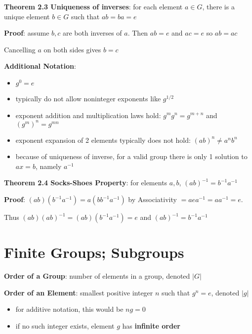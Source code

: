\documentclass{article}
\begin{document}
    \textbf{Theorem 2.3 Uniqueness of inverses}: for each element $a \in G$, there is a unique element $b \in G$ such that $ab = ba = e$

      \textbf{Proof}: assume $b, c$ are both inverses of $a$. Then $ab = e$ and $ac = e$ so $ab = ac$

      Cancelling $a$ on both sides gives $b = c$

      \bigskip
      \textbf{Additional Notation}:
      \begin{itemize}
        \item $g^0 = e$
        \item typically do not allow noninteger exponents like $g^{1/2}$
        \item exponent addition and multiplication laws hold: $g^{m}g^{n} = g^{m + n}$ and $(g^m)^n = g^{mn}$
        \item exponent expansion of 2 elements typically does not hold: $(ab)^n \neq a^n b^n$
        \item because of uniqueness of inverse, for a valid group there is only 1 solution to $ax = b$, namely $a^{-1}$
      \end{itemize}
      \bigskip

    \textbf{Theorem 2.4 Socks-Shoes Property}: for elements $a,b$, $(ab)^{-1} = b^{-1}a^{-1}$

    \textbf{Proof}: $(ab)(b^{-1}a^{-1}) = a(bb^{-1}a^{-1})$ by Associativity $= aea^{-1} = aa^{-1} = e$.

    Thus $(ab)(ab)^{-1} = (ab)(b^{-1}a^{-1}) = e$ and $(ab)^{-1} = b^{-1}a^{-1}$
  \section{Finite Groups; Subgroups}
  \textbf{Order of a Group}: number of elements in a group, denoted $|G|$

  \textbf{Order of an Element}: smallest positive integer $n$ such that $g^n = e$, denoted $|g|$
  \begin{itemize}
    \item for additive notation, this would be $ng = 0$
    \item if no such integer exists, element $g$ has \textbf{infinite order}
  \end{itemize}
\end{document}
